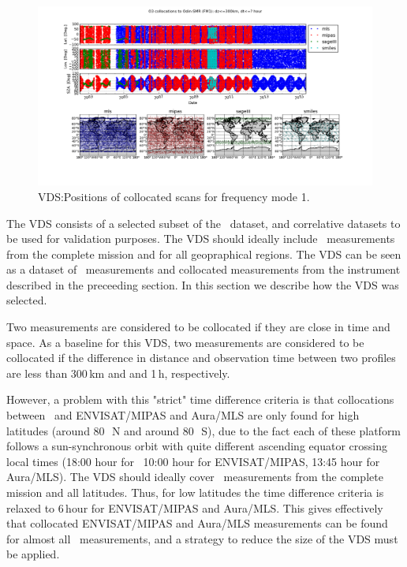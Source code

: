 \begin{figure}[t]
\centering
\includegraphics[width=17cm]{test_collocation_fm1.png}
\caption{VDS:Positions of collocated scans for frequency mode 1.}
\label{fig:vdsfm1}
\end{figure}


The VDS consists of a selected subset of the \smr\ dataset, and correlative
datasets to be used for validation purposes. 
The VDS should ideally include \smr\ measurements from    
the complete mission and for all geopraphical regions.
The VDS can be seen as a dataset of \smr\ measurements and
collocated measurements from the instrument described 
in the preceeding section. In this section we describe
how the VDS was selected.

 
Two measurements are considered to be collocated if they
are close in time and space. As a baseline for this VDS,
two measurements are considered to be collocated if the 
difference in distance and observation time between two profiles are 
less than 300\,km and and 1\,h, respectively.

However, a problem with this "strict" time difference criteria
is that collocations between \smr\ and  ENVISAT/MIPAS and Aura/MLS
are only found for high latitudes (around 80\,\degree\ N and around 80\,\degree\ S),
due to the fact each of these platform follows a sun-synchronous orbit
with quite different ascending equator crossing local times  
(18:00 hour for \smr\, 10:00 hour for ENVISAT/MIPAS,
 13:45 hour for Aura/MLS).
The VDS should ideally cover \smr\ measurements from    
the complete mission and all latitudes. 
Thus, for low latitudes the time difference criteria
is relaxed to 6\,hour for ENVISAT/MIPAS and Aura/MLS.
This gives effectively that collocated ENVISAT/MIPAS and Aura/MLS 
measurements can be found for almost all \smr\ measurements, and a strategy
to reduce the size of the VDS must be applied.

